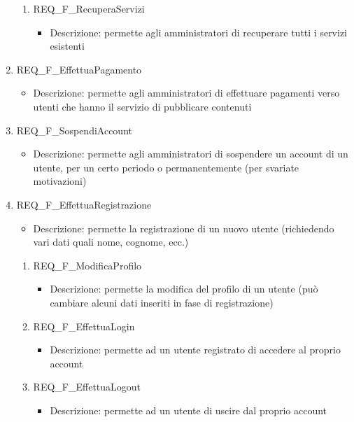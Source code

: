 \begin{enumerate}
\begin{enumerate}[label*=\arabic*.]
			\item REQ\_F\_RecuperaServizi
			\begin{itemize}	
				\item Descrizione: permette agli amministratori di recuperare tutti i servizi esistenti
			\end{itemize}
		\end{enumerate}
	\item REQ\_F\_EffettuaPagamento
		\begin{itemize}	
			\item Descrizione: permette agli amministratori di effettuare pagamenti verso utenti che hanno il servizio di pubblicare contenuti
		\end{itemize}
	\item REQ\_F\_SospendiAccount
		\begin{itemize}	
			\item Descrizione: permette agli amministratori di sospendere un account di un utente, per un certo periodo o permanentemente  (per svariate motivazioni)	
		\end{itemize}

	
	\item REQ\_F\_EffettuaRegistrazione	
		\begin{itemize}	
			\item Descrizione: permette la registrazione di un nuovo utente (richiedendo vari dati quali nome, cognome, ecc.)
		\end{itemize}
		\begin{enumerate}[label*=\arabic*.]
		\item REQ\_F\_ModificaProfilo
			\begin{itemize}	
				\item Descrizione: permette la modifica del profilo di un utente (può cambiare alcuni dati inseriti in fase di registrazione)
			\end{itemize}

		\item REQ\_F\_EffettuaLogin
			\begin{itemize}	
				\item Descrizione: permette ad un utente registrato di accedere al proprio account
			\end{itemize}

		\item REQ\_F\_EffettuaLogout
			\begin{itemize}	
				\item Descrizione: permette ad un utente di uscire dal proprio account
			\end{itemize}
		\end{enumerate}


\end{enumerate}
